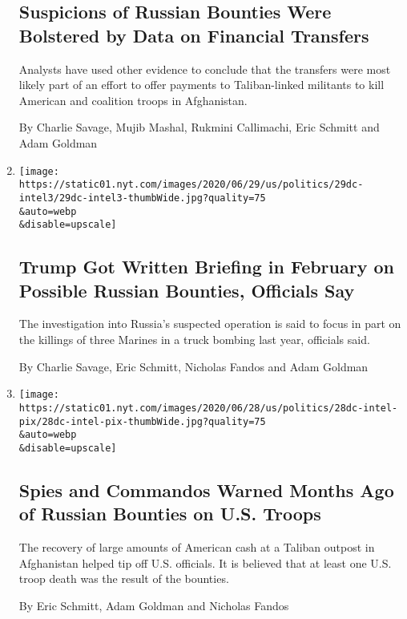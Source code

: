 \begin{enumerate}
  \hypertarget{suspicions-of-russian-bounties-were-bolstered-by-data-on-financial-transfers}{%
  \subsection{Suspicions of Russian Bounties Were Bolstered by Data on
  Financial
  Transfers}\label{suspicions-of-russian-bounties-were-bolstered-by-data-on-financial-transfers}}

  Analysts have used other evidence to conclude that the transfers were
  most likely part of an effort to offer payments to Taliban-linked
  militants to kill American and coalition troops in Afghanistan.

  By Charlie Savage, Mujib Mashal, Rukmini Callimachi, Eric Schmitt and
  Adam Goldman
\item
  \href{/2020/06/29/us/politics/russian-bounty-trump.html}{}

  \texttt{[image: https://static01.nyt.com/images/2020/06/29/us/politics/29dc-intel3/29dc-intel3-thumbWide.jpg?quality=75\\\&auto=webp\\\&disable=upscale]}

  \hypertarget{trump-got-written-briefing-in-february-on-possible-russian-bounties-officials-say}{%
  \subsection{Trump Got Written Briefing in February on Possible Russian
  Bounties, Officials
  Say}\label{trump-got-written-briefing-in-february-on-possible-russian-bounties-officials-say}}

  The investigation into Russia's suspected operation is said to focus
  in part on the killings of three Marines in a truck bombing last year,
  officials said.

  By Charlie Savage, Eric Schmitt, Nicholas Fandos and Adam Goldman
\item
  \href{/2020/06/28/us/politics/russian-bounties-warnings-trump.html}{}

  \texttt{[image: https://static01.nyt.com/images/2020/06/28/us/politics/28dc-intel-pix/28dc-intel-pix-thumbWide.jpg?quality=75\\\&auto=webp\\\&disable=upscale]}

  \hypertarget{spies-and-commandos-warned-months-ago-of-russian-bounties-on-us-troops}{%
  \subsection{Spies and Commandos Warned Months Ago of Russian Bounties
  on U.S.
  Troops}\label{spies-and-commandos-warned-months-ago-of-russian-bounties-on-us-troops}}

  The recovery of large amounts of American cash at a Taliban outpost in
  Afghanistan helped tip off U.S. officials. It is believed that at
  least one U.S. troop death was the result of the bounties.

  By Eric Schmitt, Adam Goldman and Nicholas Fandos
\end{enumerate}

